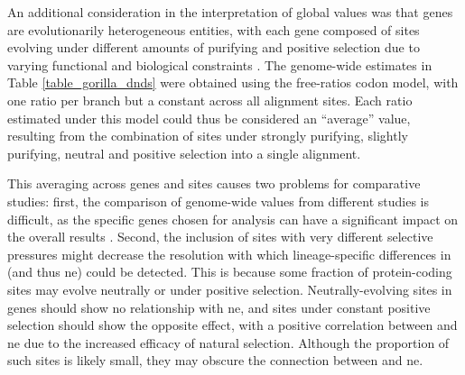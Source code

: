 An additional consideration in the interpretation of global \dnds
values was that genes are evolutionarily heterogeneous entities, with
each gene composed of sites evolving under different amounts of
purifying and positive selection due to varying functional and
biological constraints \citep{Whelan2008}. The genome-wide \dnds
estimates in Table \ref{table_gorilla_dnds} were obtained using the
free-ratios codon model, with one \dnds ratio per branch but a
constant \dnds across all alignment sites. Each \dnds ratio estimated
under this model could thus be considered an ``average'' value,
resulting from the combination of sites under strongly purifying,
slightly purifying, neutral and positive selection into a single
alignment. 

This averaging across genes and sites causes two problems for
comparative studies: first, the comparison of genome-wide \dnds values
from different studies is difficult, as the specific genes chosen for
analysis can have a significant impact on the overall results
\citep{Ellegren2008}. Second, the inclusion of sites with very
different selective pressures might decrease the resolution with which
lineage-specific differences in \dnds (and thus \ac{ne}) could be
detected. This is because some fraction of protein-coding sites may
evolve neutrally or under positive selection. Neutrally-evolving sites
in genes should show no relationship with \ac{ne}, and sites under
constant positive selection should show the opposite effect, with a
positive correlation between \dnds and \ac{ne} due to the increased
efficacy of natural selection. Although the proportion of such sites
is likely small, they may obscure the connection between \dnds and
\ac{ne}.

